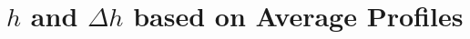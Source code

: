 

\section{$h$ and  $\Delta h$ based on Average Profiles}
\label{sec:hdeltahavprofs}

\FloatBarrier

